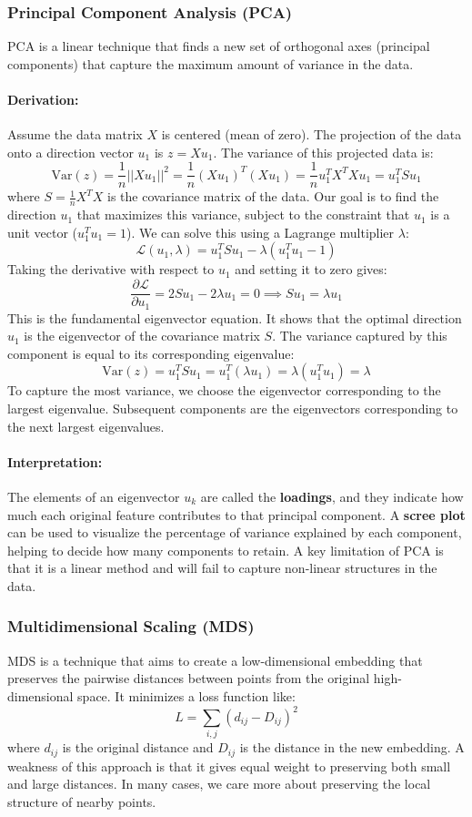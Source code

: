 \documentclass{article}
\begin{document}
\begin{multicols}{2}
	\subsubsection{Principal Component Analysis (PCA)}
	PCA is a linear technique that finds a new set of orthogonal axes (principal components) that capture the maximum amount of variance in the data.

	\paragraph{Derivation:}
	Assume the data matrix $X$ is centered (mean of zero). The projection of the data onto a direction vector $u_1$ is $z = Xu_1$. The variance of this projected data is:
	$$ \text{Var}(z) = \frac{1}{n}||Xu_1||^2 = \frac{1}{n} (Xu_1)^T (Xu_1) = \frac{1}{n} u_1^T X^T X u_1 = u_1^T S u_1 $$
	where $S = \frac{1}{n}X^T X$ is the covariance matrix of the data. Our goal is to find the direction $u_1$ that maximizes this variance, subject to the constraint that $u_1$ is a unit vector ($u_1^T u_1 = 1$). We can solve this using a Lagrange multiplier $\lambda$:
	$$ \mathcal{L}(u_1, \lambda) = u_1^T S u_1 - \lambda(u_1^T u_1 - 1) $$
	Taking the derivative with respect to $u_1$ and setting it to zero gives:
	$$ \frac{\partial \mathcal{L}}{\partial u_1} = 2Su_1 - 2\lambda u_1 = 0 \implies Su_1 = \lambda u_1 $$
	This is the fundamental eigenvector equation. It shows that the optimal direction $u_1$ is the eigenvector of the covariance matrix $S$. The variance captured by this component is equal to its corresponding eigenvalue:
	$$ \text{Var}(z) = u_1^T S u_1 = u_1^T (\lambda u_1) = \lambda (u_1^T u_1) = \lambda $$
	To capture the most variance, we choose the eigenvector corresponding to the largest eigenvalue. Subsequent components are the eigenvectors corresponding to the next largest eigenvalues.

	\paragraph{Interpretation:} The elements of an eigenvector $u_k$ are called the \textbf{loadings}, and they indicate how much each original feature contributes to that principal component. A \textbf{scree plot} can be used to visualize the percentage of variance explained by each component, helping to decide how many components to retain. A key limitation of PCA is that it is a linear method and will fail to capture non-linear structures in the data.

	\subsubsection{Multidimensional Scaling (MDS)}
	MDS is a technique that aims to create a low-dimensional embedding that preserves the pairwise distances between points from the original high-dimensional space. It minimizes a loss function like:
	$$ L = \sum_{i,j} (d_{ij} - D_{ij})^2 $$
	where $d_{ij}$ is the original distance and $D_{ij}$ is the distance in the new embedding. A weakness of this approach is that it gives equal weight to preserving both small and large distances. In many cases, we care more about preserving the local structure of nearby points.


\end{multicols}
\end{document}

